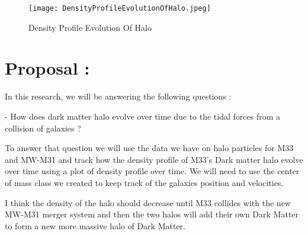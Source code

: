 \documentclass{article}
\begin{document}
\begin{figure}[htp]
    \centering
    \texttt{[image: DensityProfileEvolutionOfHalo.jpeg]}
    \caption{\cite{Delos19} Density Profile Evolution Of Halo}
    \label{fig:galaxy}
\end{figure}

\vspace{5mm}
\vspace{5mm}
\vspace{5mm}

\vspace{5mm}
\vspace{5mm}
\vspace{5mm}
\maketitle
\section{Proposal :}
\vspace{5mm}

In this research, we will be answering the following questions :
\vspace{0.5mm}

    - How does dark matter halo evolve over time due to the tidal forces from a collision of galaxies ?
\vspace{0.5mm}    

To answer that question we will use the data we have on halo particles for M33 and MW-M31 and track how the density profile of M33's Dark matter halo evolve over time using a plot of density profile over time. We will need to use the center of mass class we created to keep track of the galaxies position and velocities.
\vspace{0.5mm}

I think the density of the halo should decrease until M33 collides with the new MW-M31 merger system and then the two halos will add their own Dark Matter to form a new more massive halo of Dark Matter.










{}

\end{document}
